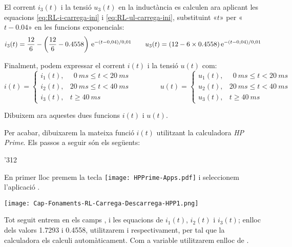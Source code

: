 \begin{exemple}
    El corrent $i_3(t)$ i la tensió $u_3(t)$ en la inductància es calculen ara aplicant les equacions \eqref{eq:RL-i-carrega-ini} i \eqref{eq:RL-ul-carrega-ini}, substituint «$t$» per «$t-\num{0,04}$» en les funcions exponencials:
    \[
        i_3(t) = \frac{12}{6} - \left(\frac{12}{6}-\num{0,4558}\right) \,\mathrm{e}^{-(t-0,04)/0,01} \qquad
        u_3(t) = (12-6\times\num{0,4558}) \,\mathrm{e}^{-(t-0,04)/0,01}
    \]

    Finalment, podem expressar el corrent $i(t)$  i la tensió $u(t)$ com:
    \[
        i(t) =
        \begin{cases}
            i_1(t), &  \phantom{0}\SI{0}{ms} \leq t < \SI{20}{ms} \\
            i_2(t), &  \SI{20}{ms} \leq t < \SI{40}{ms} \\
            i_3(t), &  t \geq \SI{40}{ms}
        \end{cases}
        \qquad\qquad
        u(t) =
        \begin{cases}
            u_1(t), &  \phantom{0}\SI{0}{ms} \leq t < \SI{20}{ms} \\
            u_2(t), &  \SI{20}{ms} \leq t < \SI{40}{ms} \\
            u_3(t), &  t \geq \SI{40}{ms}
        \end{cases}
    \]

    Dibuixem ara aquestes dues funcions  $i(t)$ i $u(t)$.

    \begin{center}
      
    \end{center}

    Per acabar, dibuixarem la mateixa funció $i(t)$ utilitzant la calculadora \emph{HP Prime}.
     Els passos a seguir són els següents:
    \begin{dingautolist}{'312}
        \item En primer lloc premem la tecla \texttt{[image: HPPrime-Apps.pdf]} i seleccionem l'aplicació .

             \texttt{[image: Cap-Fonaments-RL-Carrega-Descarrega-HPP1.png]}

        \item Tot seguit entrem en els camps ,  i  les equacions de $i_1(t)$, $i_2(t)$ i $i_3(t)$; enlloc dels valors \num{1,7293} i  \num{0,4558}, utilitzarem  i  respectivament, per tal que la calculadora els calculi automàticament. Com a variable utilitzarem  enlloc de .


\end{dingautolist}
\end{exemple}
